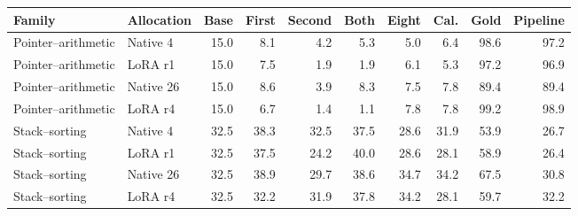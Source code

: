 \begin{tabular}{@{}llrrrrrrrr@{}}
\toprule
Family & Allocation & Base & First & Second & Both & Eight & Cal. & Gold & Pipeline\\
\midrule
Pointer--arithmetic & Native 4 & 15.0 & 8.1 & 4.2 & 5.3 & 5.0 & 6.4 & 98.6 & 97.2\\
Pointer--arithmetic & LoRA r1 & 15.0 & 7.5 & 1.9 & 1.9 & 6.1 & 5.3 & 97.2 & 96.9\\
Pointer--arithmetic & Native 26 & 15.0 & 8.6 & 3.9 & 8.3 & 7.5 & 7.8 & 89.4 & 89.4\\
Pointer--arithmetic & LoRA r4 & 15.0 & 6.7 & 1.4 & 1.1 & 7.8 & 7.8 & 99.2 & 98.9\\
\midrule
Stack--sorting & Native 4 & 32.5 & 38.3 & 32.5 & 37.5 & 28.6 & 31.9 & 53.9 & 26.7\\
Stack--sorting & LoRA r1 & 32.5 & 37.5 & 24.2 & 40.0 & 28.6 & 28.1 & 58.9 & 26.4\\
Stack--sorting & Native 26 & 32.5 & 38.9 & 29.7 & 38.6 & 34.7 & 34.2 & 67.5 & 30.8\\
Stack--sorting & LoRA r4 & 32.5 & 32.2 & 31.9 & 37.8 & 34.2 & 28.1 & 59.7 & 32.2\\
\bottomrule
\end{tabular}
